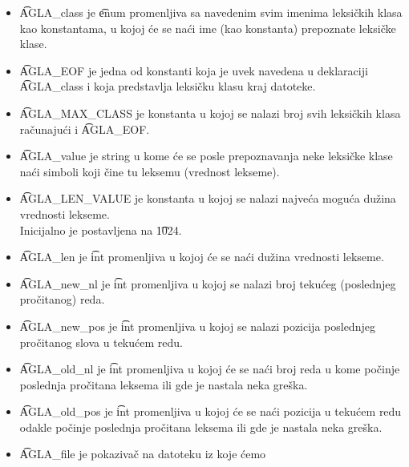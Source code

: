       \begin{itemize}
        \item
        {
          \t{AGLA\_class} je \t{enum} promenljiva sa navedenim svim imenima
          leksi\v ckih klasa kao konstantama, u kojoj \'ce se na\'ci ime
          (kao konstanta) prepoznate leksi\v cke klase.
        }
        \item
        {
          \t{AGLA\_EOF} je jedna od konstanti koja je uvek navedena u
          deklaraciji\\
          \t{AGLA\_class} i koja predstavlja leksi\v cku klasu kraj
          datoteke.
        }
        \item
        {
          \t{AGLA\_MAX\_CLASS} je konstanta u kojoj se nalazi broj svih
          leksi\v ckih klasa ra\v cunaju\'ci i \t{AGLA\_EOF}.
        }
        \item
        {
          \t{AGLA\_value} je string u kome \'ce se posle prepoznavanja
          neke leksi\v cke klase na\'ci simboli koji \v cine tu leksemu
          (vrednost lekseme).
        }
        \item
        {
          \t{AGLA\_LEN\_VALUE} je konstanta u kojoj se nalazi najve\'ca
          mogu\'ca du\v zina vrednosti lekseme.\\
          Inicijalno je postavljena na \t{1024}.
        }
        \item
        {
          \t{AGLA\_len} je \t{int} promenljiva u kojoj \'ce se na\'ci
          du\v zina vrednosti lekseme.
        }
        \item
        {
          \t{AGLA\_new\_nl} je \t{int} promenljiva u kojoj se nalazi
          broj teku\'ceg (poslednjeg pro\v citanog) reda.
        }
        \item
        {
          \t{AGLA\_new\_pos} je \t{int} promenljiva u kojoj se nalazi
          pozicija poslednjeg pro\v citanog slova u teku\'cem redu.
        }
        \item
        {
          \t{AGLA\_old\_nl} je \t{int} promenljiva u kojoj \'ce se na\'ci
          broj reda u kome po\v cinje poslednja pro\v citana leksema ili
          gde je nastala neka gre\v ska.
        }
        \item
        {
          \t{AGLA\_old\_pos} je \t{int} promenljiva u kojoj \'ce se na\'ci
          pozicija u teku\'cem redu odakle po\v cinje poslednja
          pro\v citana leksema ili gde je nastala neka gre\v ska.
        }
        \item
        {
          \t{AGLA\_file} je pokaziva\v c na datoteku iz koje \'cemo
}
\end{itemize}
